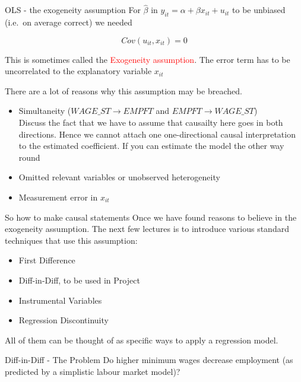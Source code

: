 \documentclass[
  ignorenonframetext,
]{beamer}
\providecommand{\tightlist}{%
  \setlength{\itemsep}{0pt}\setlength{\parskip}{0pt}}
\begin{document}
\begin{frame}{OLS - the exogeneity assumption}
\protect\hypertarget{ols---the-exogeneity-assumption}{}
For \(\widehat{\beta}\) in \(y_{it}=\alpha + \beta x_{it} + u_{it}\) to
be unbiased (i.e.~on average correct) we needed

\[Cov({u}_{it},x_{it})=0\]

This is sometimes called the \textcolor{red}{Exogeneity assumption}. The
error term has to be uncorrelated to the explanatory variable \(x_{it}\)

There are a lot of reasons why this assumption may be breached.

\begin{itemize}
  \item Simultaneity ($WAGE\_ST \rightarrow EMPFT$ and $EMPFT \rightarrow WAGE\_ST$)\\
  \footnotesize
  \textcolor{student}{Discuss the fact that we have to assume that causailty here goes in both directions. Hence we cannot attach one one-directional causal interpretation to the estimated coefficient. If you can estimate the model the other way round} \normalsize

  \item Omitted relevant variables or unobserved heterogeneity 
  \item Measurement error in $x_{it}$ 

\end{itemize}
\end{frame}

\begin{frame}{So how to make causal statements}
\protect\hypertarget{so-how-to-make-causal-statements}{}
Once we have found reasons to believe in the exogeneity assumption. The
next few lectures is to introduce various standard techniques that use
this assumption:

\begin{itemize}
\tightlist
\item
  First Difference\\
\item
  Diff-in-Diff, to be used in Project
\item
  Instrumental Variables
\item
  Regression Discontinuity
\end{itemize}

All of them can be thought of as specific ways to apply a regression
model.
\end{frame}

\begin{frame}{Diff-in-Diff - The Problem}
\protect\hypertarget{diff-in-diff---the-problem}{}
Do higher minimum wages decrease employment (as predicted by a
simplistic labour market model)?
\end{frame}
\end{document}
